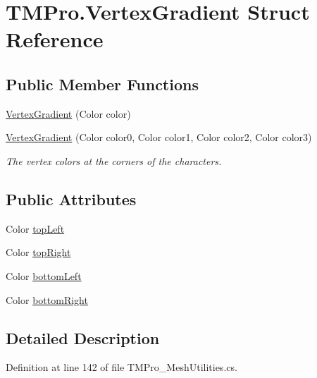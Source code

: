 \hypertarget{struct_t_m_pro_1_1_vertex_gradient}{}\section{T\+M\+Pro.\+Vertex\+Gradient Struct Reference}
\label{struct_t_m_pro_1_1_vertex_gradient}
\subsection*{Public Member Functions}
\begin{DoxyCompactItemize}
\item 
\mbox{\hyperlink{struct_t_m_pro_1_1_vertex_gradient_a6302c024c5e234ba15ed043723c1780d}{Vertex\+Gradient}} (Color color)
\item 
\mbox{\hyperlink{struct_t_m_pro_1_1_vertex_gradient_aebe3e48a4520fa379a6a8a175cb24bac}{Vertex\+Gradient}} (Color color0, Color color1, Color color2, Color color3)
\begin{DoxyCompactList}\small\item\em The vertex colors at the corners of the characters. \end{DoxyCompactList}\end{DoxyCompactItemize}
\subsection*{Public Attributes}
\begin{DoxyCompactItemize}
\item 
Color \mbox{\hyperlink{struct_t_m_pro_1_1_vertex_gradient_aded60f54fd6597247d2d898148958bff}{top\+Left}}
\item 
Color \mbox{\hyperlink{struct_t_m_pro_1_1_vertex_gradient_a1c53b6b33507f9351fd5f86ddca13d3a}{top\+Right}}
\item 
Color \mbox{\hyperlink{struct_t_m_pro_1_1_vertex_gradient_aba5da1e3ef7302485b2eaf4c9e8e508d}{bottom\+Left}}
\item 
Color \mbox{\hyperlink{struct_t_m_pro_1_1_vertex_gradient_a843ede2c57b86128932dbb9f3d380621}{bottom\+Right}}
\end{DoxyCompactItemize}


\subsection{Detailed Description}


Definition at line 142 of file T\+M\+Pro\+\_\+\+Mesh\+Utilities.\+cs.




